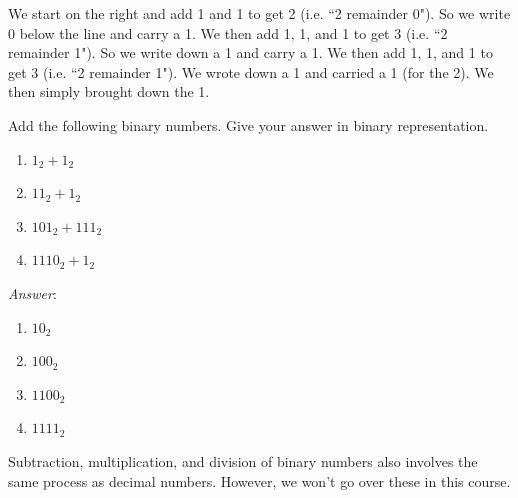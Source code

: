 We start on the right and add 1 and 1 to get 2 (i.e. ``2 remainder 0"). So we write 0 below the line and carry a 1. We then add 1, 1, and 1 to get 3 (i.e. ``2 remainder 1"). So we write down a 1 and carry a 1. We then add 1, 1, and 1 to get 3 (i.e. ``2 remainder 1"). We wrote down a 1 and carried a 1 (for the 2). We then simply brought down the 1. 

\begin{example}
Add the following binary numbers. Give your answer in binary representation. 
\begin{enumerate}
\item $1_2+1_2$
\item $11_2+1_2$
\item $101_2+111_2$
\item $1110_2+1_2$
\end{enumerate}
\noindent \emph{Answer}:
\begin{enumerate}
\item $10_2$
\item $100_2$
\item $1100_2$
\item $1111_{2}$
\end{enumerate}
\end{example}

Subtraction, multiplication, and division of binary numbers also involves the same process as decimal numbers. However, we won't go over these in this course. 


